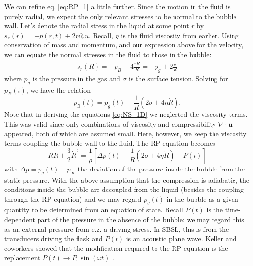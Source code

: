 \documentclass[prb,aps,nofootinbib,superscriptaddress,floatfix]{revtex4-2}
\begin{document}
We can refine eq. \ref{eq:RP_1} a little further. Since the motion in the fluid is purely radial, we expect the only relevant stresses to be normal to the bubble wall. Let's denote the radial stress in the liquid at some point $r$ by $s_r(r)=-p(r,t)+2\eta \partial_r u$. Recall, $\eta$ is the fluid viscosity from earlier. Using conservation of mass and momentum, and our expression above for the velocity, we can equate the normal stresses in the fluid to those in the bubble:
\begin{equation}
\begin{split}
    s_r(R)=-p_B-4\frac{\eta \dot{R}}{R}=-p_g+2\frac{\sigma}{R}
\end{split}
\end{equation}
where $p_g$ is the pressure in the gas and $\sigma$ is the surface tension. Solving for $p_B(t)$, we have the relation \cite{brenner2002single,prosperetti1999old,prosperetti1986bubble}
\begin{equation}
    p_B(t)=p_g(t)-\frac{1}{R}\left( 2\sigma+4\eta \dot{R} \right)
    \label{eq:p_B}.
\end{equation}
Note that in deriving the equations \ref{eq:NS_1D} we neglected the viscosity terms. This was valid since only combinations of viscosity and compressibility $\nabla \cdot \bm{u}$ appeared, both of which are assumed small. Here, however, we keep the viscosity terms coupling the bubble wall to the fluid. The RP equation becomes 
\begin{equation}
    R\ddot{R}+\frac{3}{2}\dot{R}^2 = \frac{1}{\rho} \left[ \Delta p(t)-\frac{1}{R}\left( 2\sigma+4\eta \dot{R} \right)-P(t) \right]
    \label{eq:RP_2}
\end{equation}
with $\Delta p = p_g(t)-p_\infty$ the deviation of the pressure inside the bubble from the static pressure. With the above assumption that the compression is adiabatic, the conditions inside the bubble are decoupled from the liquid (besides the coupling through the RP equation) and we may regard $p_g(t)$ in the bubble as a given quantity to be determined from an equation of state. Recall $P(t)$ is the time-dependent part of the pressure in the absence of the bubble: we may regard this as an external pressure from e.g. a driving stress. In SBSL, this is from the transducers driving the flask and $P(t)$ is an acoustic plane wave. Keller and coworkers showed that the modification required to the RP equation is the replacement $P(t) \rightarrow P_0 \sin(\omega t)$ \cite{keller1980bubble}. 

\end{document}
